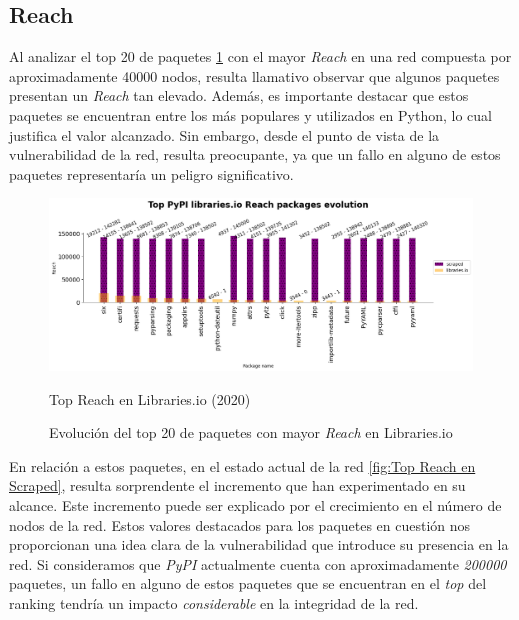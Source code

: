 \subsection{Reach}

Al analizar el top 20 de paquetes \ref{fig:Top Reach en Libraries.io} con el mayor \textit{Reach} en una
red compuesta por aproximadamente 40000 nodos, resulta llamativo observar que algunos paquetes
presentan un \textit{Reach} tan elevado. Además, es importante destacar que estos paquetes se
encuentran entre los más populares y utilizados en Python, lo cual justifica el valor alcanzado.
Sin embargo, desde el punto de vista de la vulnerabilidad de la red, resulta preocupante, ya que
un fallo en alguno de estos paquetes representaría un peligro significativo.

\begin{figure}[ht!]
    \begin{center}
        \includegraphics[width=1\textwidth]{img/pypi/top_librariesio_reach_evolution.png}
        \caption{Top Reach en Libraries.io (2020)}
    \end{center}
    \label{fig:Top Reach en Libraries.io}
    \caption{Evolución del top 20 de paquetes con mayor \textit{Reach} en Libraries.io}
\end{figure}

En relación a estos paquetes, en el estado actual de la red \ref{fig:Top Reach en Scraped}, resulta sorprendente el incremento
que han experimentado en su alcance. Este incremento puede ser explicado por el crecimiento en el
número de nodos de la red. Estos valores destacados para los paquetes en cuestión nos proporcionan
una idea clara de la vulnerabilidad que introduce su presencia en la red. Si consideramos que
\textit{PyPI} actualmente cuenta con aproximadamente \textit{200000} paquetes, un fallo en alguno de estos paquetes
que se encuentran en el \textit{top} del ranking tendría un impacto \textit{considerable} en la integridad de la red.


